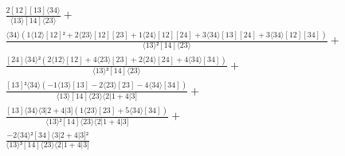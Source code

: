 \documentclass[varwidth, border=5pt]{standalone}
\begin{document}
\begin{my}
$\begin{gathered}
\scriptscriptstyle\frac{2[12][13]⟨34⟩}{⟨13⟩[14]⟨23⟩} +\\
\scriptscriptstyle\frac{⟨34⟩(1⟨12⟩[12]²+2⟨23⟩[12][23]+1⟨24⟩[12][24]+3⟨34⟩[13][24]+3⟨34⟩[12][34])}{⟨13⟩²[14]⟨23⟩} +\\
\scriptscriptstyle\frac{[24]⟨34⟩²(2⟨12⟩[12]+4⟨23⟩[23]+2⟨24⟩[24]+4⟨34⟩[34])}{⟨13⟩³[14]⟨23⟩} +\\
\scriptscriptstyle\frac{[13]²⟨34⟩(-1⟨13⟩[13]-2⟨23⟩[23]-4⟨34⟩[34])}{⟨13⟩[14]⟨23⟩⟨2|1+4|3]} +\\
\scriptscriptstyle\frac{[13]⟨34⟩⟨3|2+4|3](1⟨23⟩[23]+5⟨34⟩[34])}{⟨13⟩²[14]⟨23⟩⟨2|1+4|3]} +\\
\scriptscriptstyle\frac{-2⟨34⟩²[34]⟨3|2+4|3]²}{⟨13⟩³[14]⟨23⟩⟨2|1+4|3]} \phantom{+}
\end{gathered}$
\end{my}
\end{document}

